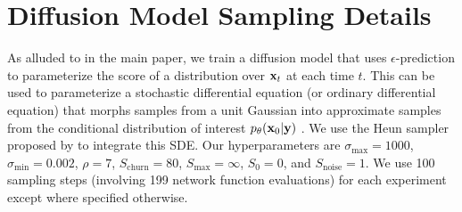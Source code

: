 \chapter{Diffusion Model Sampling Details}
As alluded to in the main paper, we train a diffusion model that uses $\epsilon$-prediction to parameterize the score of a distribution over $\mathbf{x}_t$ at each time $t$. This can be used to parameterize a stochastic differential equation (or ordinary differential equation) that morphs samples from a unit Gaussian into approximate samples from the conditional distribution of interest $p_\theta(\mathbf{x}_0|\mathbf{y})$ \citep{song2020score}. We use the Heun sampler proposed by \citet{karras2022elucidating} to integrate this SDE. Our hyperparameters are $\sigma_\text{max}=1000$, $\sigma_\text{min} = 0.002$, $\rho=7$, $S_\text{churn}=80$, $S_\text{max}=\infty$, $S_0=0$, and $S_\text{noise}=1$. We use 100 sampling steps (involving 199 network function evaluations) for each experiment except where specified otherwise. 




